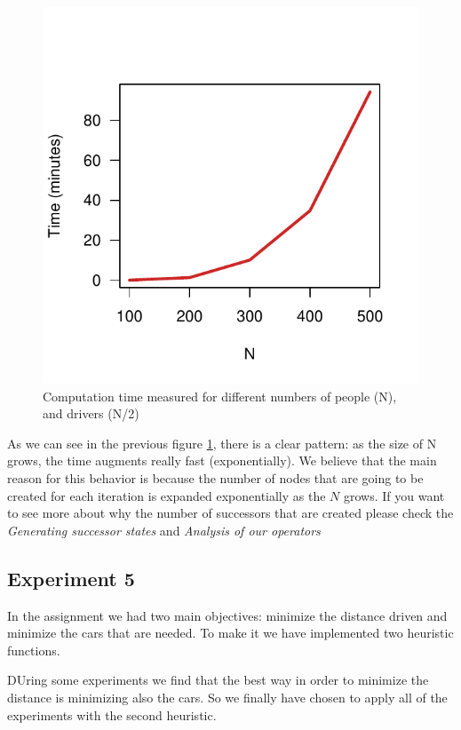 \documentclass[12]{article}
\begin{document}
\begin{figure}[H]
\centering
\includegraphics[scale=0.8]{Results/data_4_1.pdf}
\caption{Computation time measured for different numbers of people (N), and drivers (N/2)}
\label{timedifferentN}
\end{figure}
\vspace{1cm}

As we can see in the previous figure \ref{timedifferentN}, there is a clear pattern: as the size of N grows, the time augments really fast (exponentially). We believe that the main reason for this behavior is because the number of nodes that are going to be created for each iteration is expanded exponentially as the $N$ grows. If you want to see more about why the number of successors that are created please check the \textit{Generating successor states} and \textit{Analysis of our operators}


\subsection{Experiment 5}
In the assignment we had two main objectives: minimize the distance driven and minimize the cars that are needed. To make it we have implemented two heuristic functions. 

DUring some experiments we find that the best way in order to minimize the distance is minimizing also the cars. So we finally have chosen to apply all of the experiments with the second heuristic.
\end{document}
